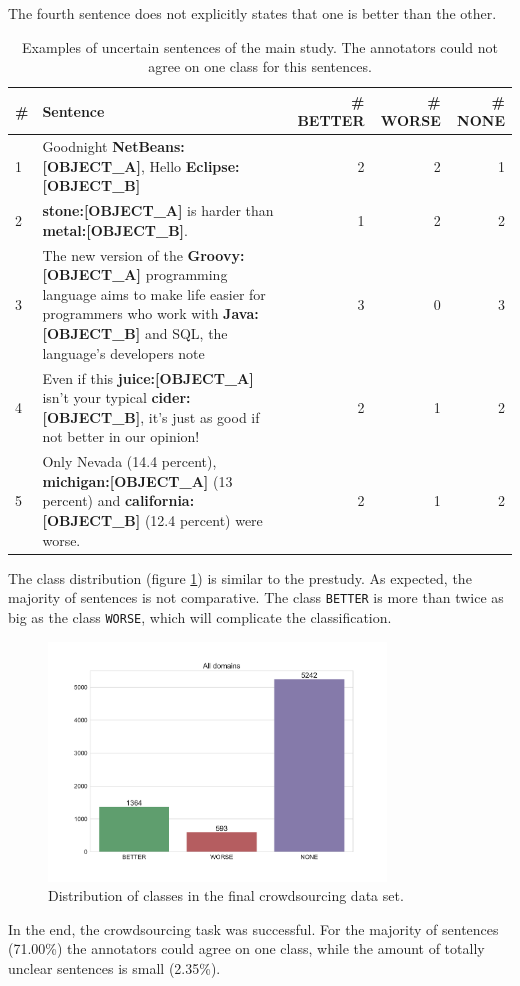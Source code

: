 The fourth sentence does not explicitly states that one is better than the other.
\begin{table}[htbp]
\centering
\caption{Examples of uncertain sentences of the main study. The annotators could not agree on one class for this sentences.}
\label{tbl:all_res}
\begin{tabularx}{\textwidth}{lXrrr}
\toprule
\# & Sentence        & \# BETTER  & \# WORSE & \# NONE            \\ \midrule
1 & Goodnight \textbf{{\color[HTML]{9A14B2}NetBeans:{[}OBJECT\_A{]}}}, Hello \textbf{{\color[HTML]{6CB219}Eclipse:{[}OBJECT\_B{]}}} & 2&2&1\\

2 & \textbf{{\color[HTML]{9A14B2}stone:{[}OBJECT\_A{]}}} is harder than \textbf{{\color[HTML]{6CB219}metal:{[}OBJECT\_B{]}}}. & 1 & 2 & 2 \\

3 & The new version of the \textbf{{\color[HTML]{9A14B2}Groovy:{[}OBJECT\_A{]}}} programming language aims to make life easier for programmers who work with \textbf{{\color[HTML]{6CB219}Java:{[}OBJECT\_B{]}}} and SQL, the language's developers note & 3 & 0 & 3 \\

4 & Even if this \textbf{{\color[HTML]{9A14B2}juice:{[}OBJECT\_A{]}}} isn't your typical \textbf{{\color[HTML]{6CB219}cider:{[}OBJECT\_B{]}}}, it's just as good if not better in our opinion! & 2 & 1 & 2 \\

5 & Only Nevada (14.4 percent), \textbf{{\color[HTML]{9A14B2}michigan:{[}OBJECT\_A{]}}}  (13 percent) and  \textbf{{\color[HTML]{6CB219}california:{[}OBJECT\_B{]}}} (12.4 percent) were worse. & 2 & 1 & 2\\
\bottomrule                              
\end{tabularx}
\end{table}


The class distribution (figure \ref{fig:all_fin}) is similar to the prestudy. As expected, the majority of sentences is not comparative. 
The class \texttt{BETTER} is more than twice as big as the class \texttt{WORSE}, which will complicate the classification.


\begin{figure}[htbp]
\centering
\caption{Distribution of classes in the final crowdsourcing data set.}
\label{fig:all_fin}
\includegraphics[width=0.8\textwidth]{images/dataset/Alldomains-dist}
\end{figure}

In the end, the crowdsourcing task was successful. For the majority of sentences (71.00\%) the annotators could agree on one class, while the amount of totally unclear sentences is small (2.35\%).
\FloatBarrier